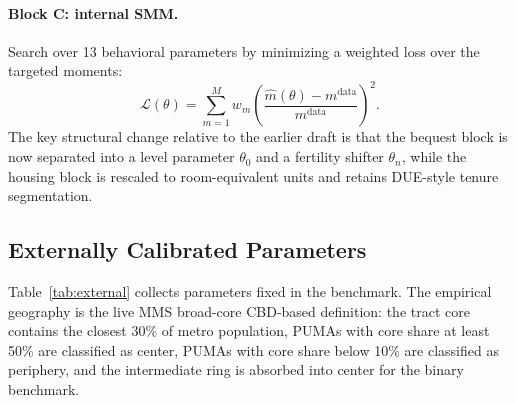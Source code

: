 \documentclass[11pt]{article}
\begin{document}
\paragraph{Block C: internal SMM.} Search over 13 behavioral parameters by minimizing a weighted loss over the targeted moments:
\begin{equation}
\mathcal{L}(\theta) = \sum_{m=1}^{M} w_m \left(\frac{\hat m(\theta) - m^{\text{data}}}{m^{\text{data}}}\right)^2.
\end{equation}
The key structural change relative to the earlier draft is that the bequest block is now separated into a level parameter $\theta_0$ and a fertility shifter $\theta_n$, while the housing block is rescaled to room-equivalent units and retains DUE-style tenure segmentation.

\subsection{Externally Calibrated Parameters}

Table~\ref{tab:external} collects parameters fixed in the benchmark. The empirical geography is the live MMS broad-core CBD-based definition: the tract core contains the closest 30\% of metro population, PUMAs with core share at least 50\% are classified as center, PUMAs with core share below 10\% are classified as periphery, and the intermediate ring is absorbed into center for the binary benchmark.
\end{document}
